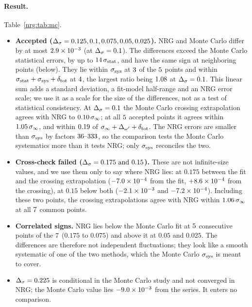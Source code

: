 \paragraph{Result.} Table~\ref{nrg:tab:mc}.
\begin{itemize}
\item \textbf{Accepted ($\Delta_\sigma=0.125, 0.1, 0.075, 0.05, 0.025$).} NRG and Monte Carlo differ by at most $2.9\times10^{-3}$ (at $\Delta_\sigma=0.1$).
  The differences exceed the Monte Carlo statistical errors, by up to $14\,\sigma_{\rm stat}$, and have the same
  sign at neighboring points (below). They lie within $\sigma_{\rm sys}$ at $3$ of the $5$ points and within
  $\sigma_{\rm stat}+\sigma_{\rm sys}+\delta_{\rm tot}$ at $4$, the largest ratio being $1.08$ at
  $\Delta_\sigma=0.1$. This linear sum adds a standard deviation, a fit-model half-range and an NRG error scale; we use it as a
  scale for the size of the differences, not as a test of statistical consistency. At $\Delta_\sigma=0.1$ the Monte Carlo
  crossing extrapolation agrees with NRG to $0.10\,\sigma_\infty$; at all $5$ accepted points it agrees
  within $1.05\,\sigma_\infty$, and within $0.19$ of $\sigma_\infty+\Delta_{\omega'}+\delta_{\rm tot}$. The NRG
  errors are smaller than $\sigma_{\rm sys}$ by factors $36\text{--}333$, so the comparison tests the Monte Carlo systematics more
  than it tests NRG; only $\sigma_{\rm sys}$ reconciles the two.
\item \textbf{Cross-check failed ($\Delta_\sigma=0.175\text{ and }0.15$).} These are not infinite-size values, and we use them only to say where NRG lies:
  at $0.175$ between the fit and the crossing extrapolation ($-7.0\times10^{-4}$ from the fit, $+8.6\times10^{-4}$ from
  the crossing), at $0.15$ below both ($-2.1\times10^{-3}$ and $-7.2\times10^{-4}$). Including these two points, the crossing
  extrapolations agree with NRG within $1.06\,\sigma_\infty$ at all $7$ common points.
\item \textbf{Correlated signs.} NRG lies below the Monte Carlo fit at $5$ consecutive points of the $7$
  ($0.175$ to $0.075$) and above it at $0.05$ and $0.025$. The differences are therefore not independent fluctuations; they look like
  a smooth systematic of one of the two methods, which the Monte Carlo $\sigma_{\rm sys}$ is meant to cover.
\item \textbf{$\Delta_\sigma=0.225$} is conditional in the Monte Carlo study and not converged in NRG; the Monte Carlo value lies
  $-9.0\times10^{-3}$ from the series. It enters no comparison.
\end{itemize}

